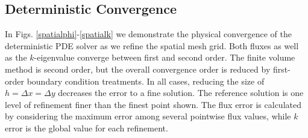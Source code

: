 \documentclass[11pt]{article}
\begin{document}
\subsection{Deterministic Convergence}
In Figs. \ref{spatialphi}-\ref{spatialk} we demonstrate the physical convergence of the deterministic PDE solver as we refine the spatial mesh grid.  Both fluxes as well as the $k$-eigenvalue converge between first and second order.  The finite volume method is second order, but the overall convergence order is reduced by first-order boundary condition treatments.  In all cases, reducing the size of $h=\Delta x=\Delta y$ decreases the error to a fine solution.  The reference solution is one level of refinement finer than the finest point shown.   The flux error is calculated by considering the maximum error among several pointwise flux values, while $k$ error is the global value for each refinement.
\end{document}
